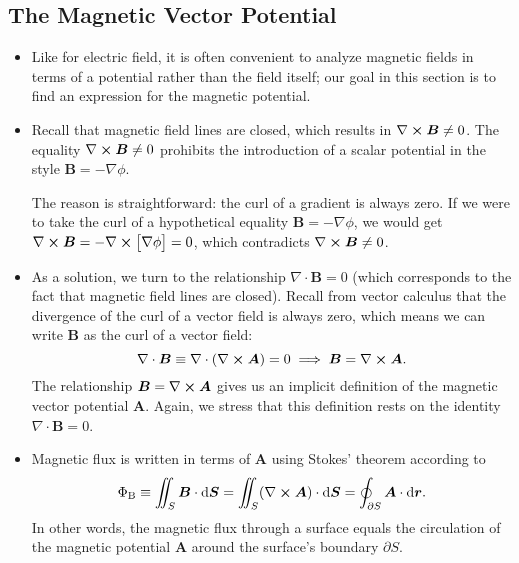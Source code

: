 \documentclass[11pt, a4paper]{article}
\newcommand{\diff}{\mathop{}\!\mathrm{d}} %
\renewcommand{\vec}[1]{\bm{#1}} %
\renewcommand{\r}{\vec{r}}
\newcommand{\B}{\vec{B}} %
\newcommand{\A}{\vec{A}} %
\renewcommand{\div}{\nabla \cdot}
\renewcommand{\curl}{\nabla \cross}
\renewcommand{\grad}{\nabla}
\begin{document}
\subsection{The Magnetic Vector Potential}
\begin{itemize}
	\item Like for electric field, it is often convenient to analyze magnetic fields in terms of a potential rather than the field itself; our goal in this section is to find an expression for the magnetic potential.
	
    \item Recall that magnetic field lines are closed, which results in $ \curl \B \neq 0 $. The equality $ \curl \B \neq 0 $ prohibits the introduction of a scalar potential in the style $ \B = - \grad \phi $.

    The reason is straightforward: the curl of a gradient is always zero. If we were to take the curl of a hypothetical equality $ \B = - \grad \phi $, we would get $ \curl \B = - \curl \big[ \grad \phi \big] = 0 $, which contradicts $ \curl \B \neq 0 $. 
	
	\item As a solution, we turn to the relationship $ \div \B = 0 $ (which corresponds to the fact that magnetic field lines are closed). Recall from vector calculus that the divergence of the curl of a vector field is always zero, which means we can write $ \B $ as the curl of a vector field:
	\begin{equation*}
		\div \B \equiv \div \left(\curl \A\right) = 0 \implies \B = \curl \A. 
	\end{equation*}
    The relationship $ \B = \curl \A $ gives us an implicit definition of the magnetic vector potential $ \A $. Again, we stress that this definition rests on the identity $ \div \B = 0 $. 
	
	\item Magnetic flux is written in terms of $ \A $ using Stokes' theorem according to
	\begin{equation*}
		\Phi_{\text{B}} \equiv \iint_{S}\B \cdot \diff \vec{S} = \iint_{S} (\curl \A) \cdot \diff \vec{S} = \oint_{\partial S} \A \cdot \diff \r.
	\end{equation*}
	In other words, the magnetic flux through a surface equals the circulation of the magnetic potential $ \A $ around the surface's boundary $ \partial S $.

\end{itemize}
\end{document}

